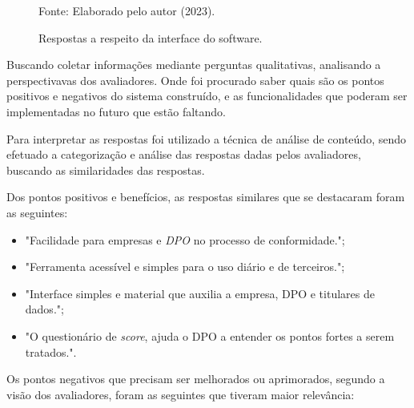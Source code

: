 \documentclass[
	12pt,				%
	openright,			%
	oneside,			%
	a4paper,			%
	english,			%
	french,				%
	spanish,			%
	brazil,				%
	]{abntex2}
\begin{document}
\begin{figure}[ht]
    \centering
    \caption{Respostas a respeito da interface do software.}
    \label{fig: graficob2}
    
    \centering \small Fonte: Elaborado pelo autor (2023).
\end{figure}


Buscando coletar informações mediante perguntas qualitativas, analisando a perspectivavas dos avaliadores. Onde foi procurado saber quais são os pontos positivos e negativos do sistema construído, e as funcionalidades que poderam ser implementadas no futuro que estão faltando. 

Para interpretar as respostas foi utilizado a técnica de análise de conteúdo, sendo efetuado a categorização e análise das respostas dadas pelos avaliadores, buscando as similaridades das respostas.

Dos pontos positivos e benefícios, as respostas similares que se destacaram foram as seguintes: 
\begin{itemize}
 \item "Facilidade para empresas e \textit{DPO} no processo de conformidade.";
 \item "Ferramenta acessível e simples para o uso diário e de terceiros.";
 \item "Interface simples e material que auxilia a empresa, DPO e titulares de dados.";
 \item "O questionário de \textit{score}, ajuda o DPO a entender os pontos fortes a serem tratados.".
\end{itemize}

Os pontos negativos que precisam ser melhorados ou aprimorados, segundo a visão dos avaliadores, foram as seguintes que tiveram maior relevância:
\end{document}
